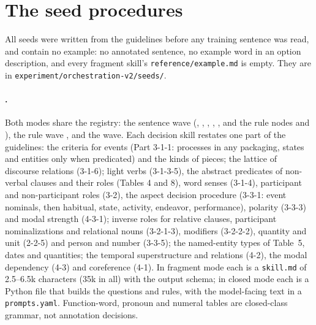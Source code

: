 \section{The seed procedures}
\label{app:seeds}

All seeds were written from the guidelines before any training sentence was read, and contain no
example: no annotated sentence, no example word in an option description, and every fragment skill's
\texttt{reference/example.md} is empty. They are in \texttt{experiment/orchestration-v2/seeds/}.

\paragraph{\umr.} Both modes share the registry: the sentence wave (, , , , , and the rule nodes  and ), the rule wave , and the  wave. Each decision skill restates one part of the guidelines:  the criteria for events (Part 3-1-1: processes in any packaging, states and entities only when predicated) and the kinds of pieces;  the lattice of discourse relations (3-1-6);  light verbs (3-1-3-5), the abstract predicates of non-verbal clauses and their roles (Tables 4 and 8), word senses (3-1-4), participant and non-participant roles (3-2), the aspect decision procedure (3-3-1: event nominals, then habitual, state, activity, endeavor, performance), polarity (3-3-3) and modal strength (4-3-1);  inverse roles for relative clauses, participant nominalizations and relational nouns (3-2-1-3), modifiers (3-2-2-2), quantity and unit (2-2-5) and person and number (3-3-5);  the named-entity types of Table~5, dates and quantities;  the temporal superstructure and relations (4-2), the modal dependency (4-3) and coreference (4-1). In fragment mode each is a \texttt{skill.md} of 2.5--6.5k characters (35k in all) with the output schema; in closed mode each is a Python file that builds the questions and rules, with the model-facing text in a \texttt{prompts.yaml}. Function-word, pronoun and numeral tables are closed-class grammar, not annotation decisions.

